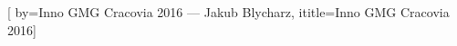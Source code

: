 




[ by={Inno GMG Cracovia 2016 — Jakub Blycharz}, ititle={Inno GMG Cracovia 2016}]
\ifchorded
\fi


\ifchorded
\vspace*{\versesep}
\vspace*{-\versesep}
\beginverse*

\nolyrics

